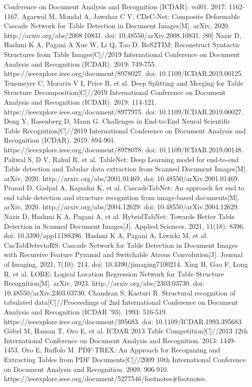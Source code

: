 \documentclass[UTF8,12pt, AutoFakeBold,fontset = founder]{ctexart}
\begin{document}
\begin{thebibliography}{00}
    Conference on Document Analysis and Recognition
    (ICDAR): vol01. 2017: 1162-1167.
     Agarwal M, Mondal A, Jawahar C V. CDeC-Net: Composite Deformable Cascade Network for Table Detection in Document Images[M]. arXiv, 2020. http://arxiv.org/abs/2008.10831. doi: 10.48550/arXiv.2008.10831. [80] Nazir D, Hashmi K A, Pagani A
     Xue W, Li Q, Tao D. ReS2TIM: Reconstruct Syntactic Structures from Table Images[C]//2019 International
    Conference on Document Analysis and Recognition
    (ICDAR). 2019: 749-755. https://ieeexplore.ieee.org/document/8978027. doi: 10.1109/ICDAR.2019.00125.
     Tensmeyer C, Morariu V I, Price B, et al. Deep Splitting and
    Merging for Table Structure Decomposition[C]//2019
    International Conference on Document Analysis and
    Recognition (ICDAR). 2019: 114-121. https://ieeexplore.ieee.org/document/8977975. doi: 10.1109/ICDAR.2019.00027.
     Deng Y, Rosenberg D, Mann G. Challenges in End-to-End Neural Scientific Table Recognition[C]//2019 International Conference on Document Analysis and Recognition (ICDAR). 2019: 894-901. https://ieeexplore.ieee.org/document/8978078. doi: 10.1109/ICDAR.2019.00148.
     Paliwal S, D V, Rahul R, et al. TableNet: Deep Learning model for end-to-end Table detection and Tabular data
    extraction from Scanned Document Images[M]. arXiv, 2020. http://arxiv.org/abs/2001.01469. doi: 10.48550/arXiv.2001.01469.
     Prasad D, Gadpal A, Kapadni K, et al. CascadeTabNet: An approach for end to end table detection and structure recognition from image-based documents[M]. arXiv, 2020. http://arxiv.org/abs/2004.12629. doi: 10.48550/arXiv.2004.12629.
     Nazir D, Hashmi K A, Pagani A, et al. HybridTabNet: Towards Better Table Detection in Scanned Document Images[J]. Applied Sciences, 2021, 11(18): 8396. doi: 10.3390/app11188396.
     Hashmi K A, Pagani A, Liwicki M, et al. CasTabDetectoRS: Cascade Network for Table Detection in Document Images with Recursive Feature Pyramid and Switchable Atrous Convolution[J]. Journal of Imaging, 2021, 7(10): 214. doi: 10.3390/jimaging7100214.
     Xing H, Gao F, Long R, et al. LORE: Logical Location Regression Network for Table Structure Recognition[M]. arXiv, 2023. http://arxiv.org/abs/2303.03730. doi: 10.48550/arXiv.2303.03730.
     Chandran S, Kasturi R. Structural recognition of tabulated data[C]//Proceedings of 2nd International Conference on Document Analysis and Recognition (ICDAR ’93). 1993: 516-519. https://ieeexplore.ieee.org/document/395683. doi: 10.1109/ICDAR.1993.395683.
      Göbel M, Hassan T, Oro E, et al. ICDAR 2013 Table Competition[C]//2013 12th International Conference on Document Analysis and Recognition. 2013: 1449-1453.
     Oro E, Ruffolo M. PDF-TREX: An Approach for Recognizing and Extracting Tables from PDF Documents[C]//2009 10th International Conference on Document Analysis and Recognition. 2009: 906-910. https://ieeexplore.ieee.org/document/5277546/footnotes\#footnotes.




\end{thebibliography}
\end{document}
